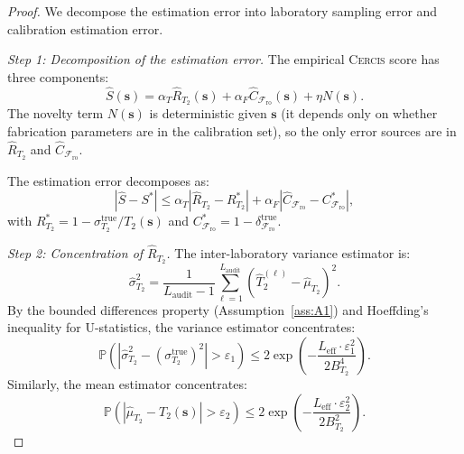 \documentclass[11pt,a4paper]{article}
\newcommand{\eff}{\mathrm{eff}}
\theoremstyle{definition}
\newcommand{\Cercis}{\textsc{Cercis}}
\newcommand{\Pbb}{\mathbb{P}}
\newcommand{\Ttwo}{T_2}
\newcommand{\FidReadout}{\mathcal{F}_{\text{ro}}}
\begin{document}
\begin{proof}
We decompose the estimation error into laboratory sampling error and
calibration estimation error.

\medskip\noindent\textit{Step 1: Decomposition of the estimation error.}
The empirical \Cercis{} score has three components:
\begin{equation}
    \widehat{S}(\mathbf{s}) = \alpha_T \widehat{R}_{\Ttwo}(\mathbf{s}) + \alpha_F \widehat{C}_{\FidReadout}(\mathbf{s}) + \eta N(\mathbf{s}).
\end{equation}
The novelty term $N(\mathbf{s})$ is deterministic given $\mathbf{s}$ (it
depends only on whether fabrication parameters are in the calibration
set), so the only error sources are in $\widehat{R}_{\Ttwo}$ and $\widehat{C}_{\FidReadout}$.

The estimation error decomposes as:
\begin{equation}
    |\widehat{S} - S^*| \leq \alpha_T |\widehat{R}_{\Ttwo} - R_{\Ttwo}^*| + \alpha_F |\widehat{C}_{\FidReadout} - C_{\FidReadout}^*|,
\end{equation}
with $R_{\Ttwo}^* = 1 - \sigma_{\Ttwo}^{\text{true}} / \Ttwo(\mathbf{s})$ and
$C_{\FidReadout}^* = 1 - \delta_{\FidReadout}^{\text{true}}$.

\medskip\noindent\textit{Step 2: Concentration of $\widehat{R}_{\Ttwo}$.}
The inter-laboratory variance estimator is:
\begin{equation}
    \widehat{\sigma}_{\Ttwo}^2 = \frac{1}{L_{\text{audit}}-1} \sum_{\ell=1}^{L_{\text{audit}}} (\widehat{T}_2^{(\ell)} - \widehat{\mu}_{\Ttwo})^2.
\end{equation}
By the bounded differences property (Assumption~\ref{ass:A1}) and Hoeffding's
inequality for U-statistics, the variance estimator concentrates:
\begin{equation}
    \Pbb(|\widehat{\sigma}_{\Ttwo}^2 - (\sigma_{\Ttwo}^{\text{true}})^2| > \varepsilon_1)
    \leq 2\exp\!\left(-\frac{L_{\eff} \cdot \varepsilon_1^2}{2 B_{\Ttwo}^4}\right).
\end{equation}
Similarly, the mean estimator concentrates:
\begin{equation}
    \Pbb(|\widehat{\mu}_{\Ttwo} - \Ttwo(\mathbf{s})| > \varepsilon_2)
    \leq 2\exp\!\left(-\frac{L_{\eff} \cdot \varepsilon_2^2}{2 B_{\Ttwo}^2}\right).
\end{equation}


\end{proof}
\end{document}
